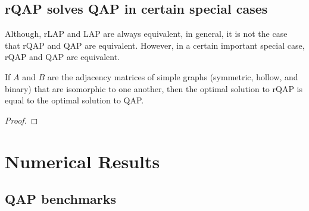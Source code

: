 \documentclass[10pt,journal,cspaper,compsoc]{IEEEtran}
\begin{document}



\subsection{rQAP solves QAP in certain special cases} %
\label{sub:rqap_solves_qap_}

Although, rLAP and LAP are always equivalent, in general, it is not the case that rQAP and QAP are equivalent.  However, in a certain important special case, rQAP and QAP are equivalent.
\begin{thm}
	If $A$ and $B$ are the adjacency matrices of simple graphs (symmetric, hollow, and binary) that are isomorphic to one another, then the optimal solution to rQAP is equal to the optimal solution to QAP.
\end{thm}
\begin{proof}

\end{proof}



\section{Numerical Results} %
\label{sub:numerical_results}



\subsection{QAP benchmarks}
\end{document}
